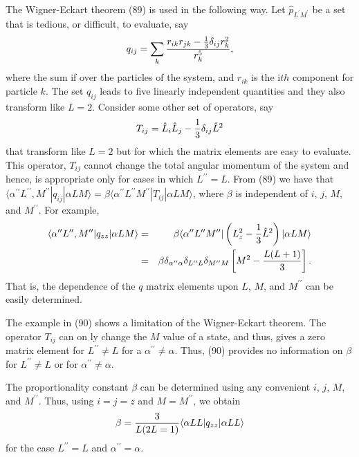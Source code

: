 The Wigner-Eckart theorem (89) is used in the following way.  Let 
${\hat{p}}_{L^{\prime}M^{\prime}}$ be a set that is tedious, or 
difficult, to evaluate, say
\begin{equation}
q_{ij} = \sum_k {r_{ik}r_{jk} - {1 \over 3} \delta_{ij}r^2_k \over 
r^5_k},
\end{equation}
where the sum if over the particles of the system, and $r_{ik}$ is 
the i$th$ component for particle $k$.  The set $q_{ij}$ leads to five 
linearly independent quantities and they also transform like $L = 
2$.  Consider some other set of operators, say
\begin{equation}
T_{ij} = {\hat{L}}_i {\hat{L}}_j - {1 \over 3} \delta_{ij} {\hat{L}}^2
\end{equation}
that transform like $L = 2$ but for which the matrix elements are easy 
to evaluate.  This operator, $T_{ij}$ cannot change the total angular 
momentum of the system and hence, is appropriate only for cases in 
which $L^{\prime \prime} = L$.  From (89) we have that 
$\langle \alpha^{\prime \prime} L^{\prime \prime} , M^{\prime 
\prime} | q_{ij} | \alpha LM \rangle = \beta
\langle \alpha^{\prime \prime} L^{\prime \prime} M^{\prime \prime} |
T_{ij} | \alpha LM \rangle$, where $\beta$ is independent of $i$, 
$j$, $M$, and $M^{\prime \prime}$.  For example,
\begin{eqnarray}
\langle \alpha^{\prime \prime} L^{\prime \prime} , M^{\prime 
\prime} | q_{zz} | \alpha LM \rangle &=& \beta
\langle \alpha^{\prime \prime} L^{\prime \prime} M^{\prime \prime} | 
\left( L^2_z - {1 \over 3} {\hat{L}}^2 \right) | \alpha LM \rangle\cr
&=& \beta \delta_{\alpha^{\prime \prime}\alpha} 
\delta_{L^{\prime \prime}L} \delta_{M^{\prime \prime}M} 
\left[ M^2 - {L(L+1) \over 3} \right].
\label{chap16-eqno90}
\end{eqnarray}
That is, the dependence of the $q$ matrix elements upon $L$, $M$, 
and $M^{\prime \prime}$ can be easily determined.

The example in (90) shows a limitation of the Wigner-Eckart theorem.  
The operator $T_{ij}$ can on ly change the $M$ value of a state, and 
thus, gives a zero matrix element for $L^{\prime \prime} \not= L$ for 
a $\alpha^{\prime \prime} \not= \alpha$.  Thus, (90) provides no 
information on $\beta$ for $L^{\prime \prime} \not= L$ or for 
$\alpha^{\prime \prime} \not= \alpha$.

The proportionality constant $\beta$ can be determined using any 
convenient $i$, $j$, $M$, and $M^{\prime \prime}$.  Thus, using $i = 
j = z$ and $M = M^{\prime \prime}$, we obtain
\begin{equation}
\beta = {3 \over L(2L=1)} \langle \alpha LL | q_{zz} | \alpha LL 
\rangle
\end{equation}
for the case $L^{\prime \prime} = L$ and $\alpha^{\prime \prime} = 
\alpha$.

